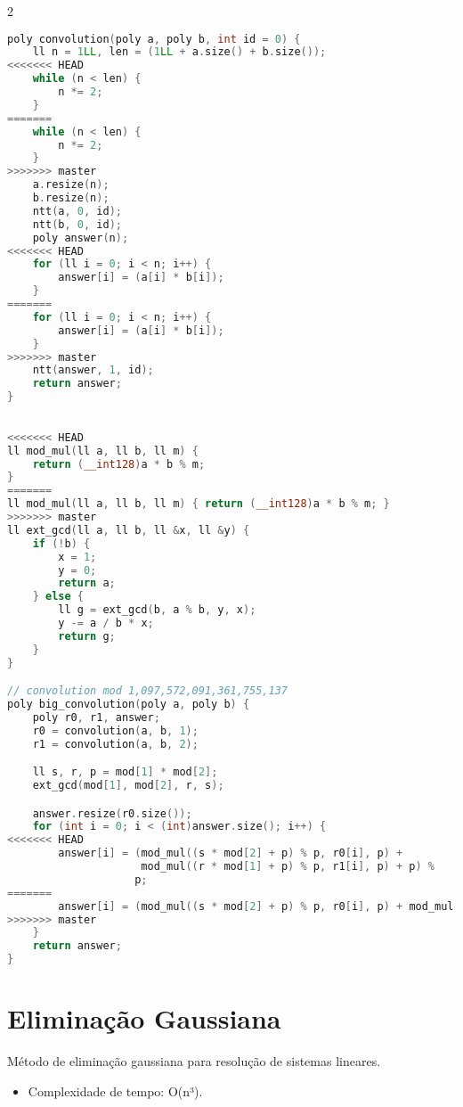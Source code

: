 \documentclass[11pt, a4paper, oneside]{book}
\begin{document}
\begin{multicols}{2}
\begin{lstlisting}[language=C++]
poly convolution(poly a, poly b, int id = 0) {
    ll n = 1LL, len = (1LL + a.size() + b.size());
<<<<<<< HEAD
    while (n < len) {
        n *= 2;
    }
=======
    while (n < len) {
        n *= 2;
    }
>>>>>>> master
    a.resize(n);
    b.resize(n);
    ntt(a, 0, id);
    ntt(b, 0, id);
    poly answer(n);
<<<<<<< HEAD
    for (ll i = 0; i < n; i++) {
        answer[i] = (a[i] * b[i]);
    }
=======
    for (ll i = 0; i < n; i++) {
        answer[i] = (a[i] * b[i]);
    }
>>>>>>> master
    ntt(answer, 1, id);
    return answer;
}
\end{lstlisting}
\end{multicols}

\hfill

\begin{lstlisting}[language=C++]

<<<<<<< HEAD
ll mod_mul(ll a, ll b, ll m) {
    return (__int128)a * b % m;
}
=======
ll mod_mul(ll a, ll b, ll m) { return (__int128)a * b % m; }
>>>>>>> master
ll ext_gcd(ll a, ll b, ll &x, ll &y) {
    if (!b) {
        x = 1;
        y = 0;
        return a;
    } else {
        ll g = ext_gcd(b, a % b, y, x);
        y -= a / b * x;
        return g;
    }
}

// convolution mod 1,097,572,091,361,755,137
poly big_convolution(poly a, poly b) {
    poly r0, r1, answer;
    r0 = convolution(a, b, 1);
    r1 = convolution(a, b, 2);

    ll s, r, p = mod[1] * mod[2];
    ext_gcd(mod[1], mod[2], r, s);

    answer.resize(r0.size());
    for (int i = 0; i < (int)answer.size(); i++) {
<<<<<<< HEAD
        answer[i] = (mod_mul((s * mod[2] + p) % p, r0[i], p) +
                     mod_mul((r * mod[1] + p) % p, r1[i], p) + p) %
                    p;
=======
        answer[i] = (mod_mul((s * mod[2] + p) % p, r0[i], p) + mod_mul((r * mod[1] + p) % p, r1[i], p) + p) % p;
>>>>>>> master
    }
    return answer;
}
\end{lstlisting}
\hfill

\section{Eliminação Gaussiana}


Método de eliminação gaussiana para resolução de sistemas lineares.



\begin{itemize}
\item Complexidade de tempo: O(n³).
\end{itemize}
\end{document}
